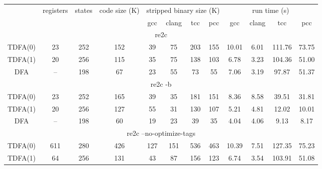 \documentclass{article}
\newenvironment{Xtab}
    {\par\medskip\noindent\minipage{\linewidth}\begin{center}}
    {\end{center}\endminipage\par\medskip}
\theoremstyle{definition}
\begin{document}
\begin{Xtab}\label{table3}
\begin{center}
    \begin{tabular}{|c|ccccccccccc|}
    \hline
    & registers & states & code size (K) & \multicolumn{4}{c}{stripped binary size (K)} & \multicolumn{4}{c|}{run time (s)} \\
    & & &
        & gcc & clang & tcc & pcc
        & gcc & clang & tcc & pcc \\
    \hline \hline
    \multicolumn{12}{|c|}{re2c} \\
    \hline
    TDFA(0) & 23 & 252 & 152 & 39 & 75 & 203 & 155 & 10.01 & 6.01 & 111.76 & 73.75 \\
    TDFA(1) & 20 & 256 & 115 & 35 & 75 & 138 & 103 &  6.78 & 3.23 & 104.36 & 51.00 \\
    DFA     & -- & 198 &  67 & 23 & 55 &  73 &  55 &  7.06 & 3.19 &  97.87 & 51.37 \\
    \hline \hline
    \multicolumn{12}{|c|}{re2c -b} \\
    \hline
    TDFA(0) & 23 & 252 & 165 & 39 & 35 & 181 & 151 & 8.36 & 8.58 & 39.51 & 31.81 \\
    TDFA(1) & 20 & 256 & 127 & 55 & 31 & 130 & 107 & 5.21 & 4.81 & 12.02 & 10.01 \\
    DFA     & -- & 198 &  60 & 19 & 23 &  39 &  35 & 4.04 & 4.06 &  9.13 &  8.17 \\
    \hline \hline
    \multicolumn{12}{|c|}{re2c --no-optimize-tags} \\
    \hline
    TDFA(0) & 611 & 280 & 426 & 127 & 151 & 536 & 463 & 10.39 & 7.51 & 127.35 & 75.23 \\
    TDFA(1) &  64 & 256 & 131 &  43 &  87 & 156 & 123 &  6.74 & 3.54 & 103.91 & 51.08 \\
    \hline
    \end{tabular}
\end{center}
\end{Xtab}
\end{document}
